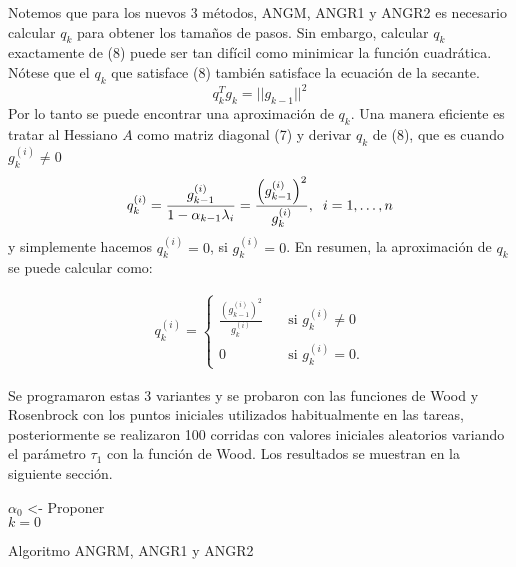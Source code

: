\documentclass[conference]{IEEEtran}
\begin{document}
    Notemos que para los nuevos 3 métodos, ANGM, ANGR1 y ANGR2 es necesario calcular $q_k$ para obtener los tamaños de pasos. Sin embargo, calcular $q_k$ exactamente de (8) puede ser tan difícil como minimicar la función cuadrática. Nótese que el $q_k$ que satisface (8) también satisface la ecuación de la secante.
    $$q_k^T g_k = ||g_{k-1}||^2$$
    Por lo tanto se puede encontrar una aproximación de $q_k$. Una manera eficiente es tratar al Hessiano $A$ como matriz diagonal (7) y derivar $q_k$ de (8), que es cuando $g_k^{(i)} \neq 0$
    $$q_k^{(i)}= \frac{g_{k-1}^{(i)}}{1 - \alpha_{k-1}\lambda_i} = \frac{\left(g_{k-1}^{(i)}\right)^2}{g_{k}^{(i)}}, \hspace{0.2cm} i = 1,\hdots,n$$
    y simplemente hacemos $q_k^{(i)}=0$, si $g_k^{(i)}=0$. En resumen, la aproximación de $q_k$ se puede calcular como:


    \begin{align}
        q_k^{(i)} =
         \begin{cases}
           \text{$\frac{\left(g_{k-1}^{(i)}\right)^2}{g_{k}^{(i)}}$} &\quad\text{si  } g_k^{(i)}\neq0\\
            \text{0} &\quad\text{si  }
            g_k^{(i)} = 0.
         \end{cases}
    \end{align}

    Se programaron estas 3 variantes y se probaron con las funciones de Wood y Rosenbrock con los puntos iniciales utilizados habitualmente en las tareas, posteriormente se realizaron 100 corridas con valores iniciales aleatorios variando el parámetro $\tau_1$ con la función de Wood. Los resultados se muestran en la siguiente sección.

    \begin{algorithm}[h]
        \SetAlgoLined
        $\alpha_0$ <- Proponer \\
        $k=0$ \\
        \caption{Algoritmo ANGRM, ANGR1 y ANGR2}
        \label{A1}
    \end{algorithm}
\end{document}
